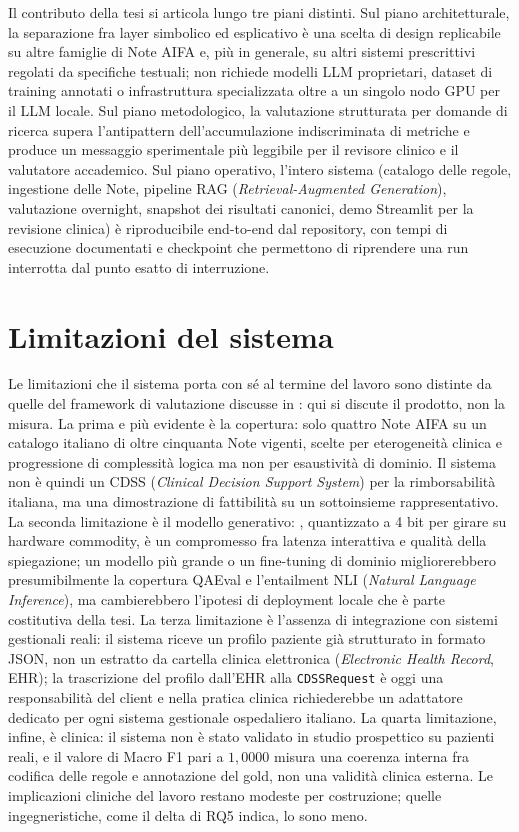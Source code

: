 Il contributo della tesi si articola lungo tre piani distinti. Sul piano architetturale, la separazione fra layer simbolico ed esplicativo è una scelta di design replicabile su altre famiglie di Note AIFA e, più in generale, su altri sistemi prescrittivi regolati da specifiche testuali; non richiede modelli LLM proprietari, dataset di training annotati o infrastruttura specializzata oltre a un singolo nodo GPU per il LLM locale. Sul piano metodologico, la valutazione strutturata per domande di ricerca supera l'antipattern dell'accumulazione indiscriminata di metriche e produce un messaggio sperimentale più leggibile per il revisore clinico e il valutatore accademico. Sul piano operativo, l'intero sistema (catalogo delle regole, ingestione delle Note, pipeline RAG (\emph{Retrieval-Augmented Generation}), valutazione overnight, snapshot dei risultati canonici, demo Streamlit per la revisione clinica) è riproducibile end-to-end dal repository, con tempi di esecuzione documentati e checkpoint che permettono di riprendere una run interrotta dal punto esatto di interruzione.

\section{Limitazioni del sistema}
\label{sec:concl-limitazioni}

Le limitazioni che il sistema porta con sé al termine del lavoro sono distinte da quelle del framework di valutazione discusse in : qui si discute il prodotto, non la misura. La prima e più evidente è la copertura: solo quattro Note AIFA su un catalogo italiano di oltre cinquanta Note vigenti, scelte per eterogeneità clinica e progressione di complessità logica ma non per esaustività di dominio. Il sistema non è quindi un CDSS (\emph{Clinical Decision Support System}) per la rimborsabilità italiana, ma una dimostrazione di fattibilità su un sottoinsieme rappresentativo. La seconda limitazione è il modello generativo: \llmmodel, quantizzato a 4 bit per girare su hardware commodity, è un compromesso fra latenza interattiva e qualità della spiegazione; un modello più grande o un fine-tuning di dominio migliorerebbero presumibilmente la copertura QAEval e l'entailment NLI (\emph{Natural Language Inference}), ma cambierebbero l'ipotesi di deployment locale che è parte costitutiva della tesi. La terza limitazione è l'assenza di integrazione con sistemi gestionali reali: il sistema riceve un profilo paziente già strutturato in formato JSON, non un estratto da cartella clinica elettronica (\emph{Electronic Health Record}, EHR); la trascrizione del profilo dall'EHR alla \texttt{CDSSRequest} è oggi una responsabilità del client e nella pratica clinica richiederebbe un adattatore dedicato per ogni sistema gestionale ospedaliero italiano. La quarta limitazione, infine, è clinica: il sistema non è stato validato in studio prospettico su pazienti reali, e il valore di Macro F1 pari a $1{,}0000$ misura una coerenza interna fra codifica delle regole e annotazione del gold, non una validità clinica esterna. Le implicazioni cliniche del lavoro restano modeste per costruzione; quelle ingegneristiche, come il delta di RQ5 indica, lo sono meno.

